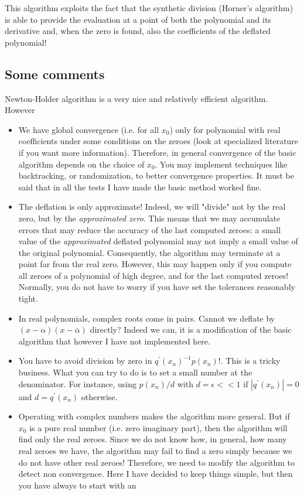 \documentclass[10pt,a4paper]{article}
\theoremstyle{definition}%
\begin{document}
This algorithm  exploits the fact that the synthetic division (Horner's algorithm) is able to provide the evaluation at a point of both the polynomial and its derivative and, when the zero is found, also the coefficients of the deflated polynomial! 
\subsection{Some comments}
Newton-Holder algorithm is a very nice and relatively efficient algorithm. However
\begin{itemize}
    \item We have global convergence (i.e. for all $x_0$) only for polynomial with real coefficients under some conditions on the zeroes (look at specialized literature if you want more information). Therefore, in general convergence of the basic algorithm depends on the choice of $x_0$. You may implement techniques like backtracking, or randomization, to better convergence properties. It must be said that in all the tests I have made the basic method worked fine.
    \item The deflation is only approximate! Indeed, we will "divide" not by the real zero, but by the \emph{approximated zero}. This means that we may accumulate errors that may reduce the accuracy of the last computed zeroes: a small value of the \emph{approximated} deflated polynomial may not imply a small value of the original polynomial. Consequently, the algorithm may terminate at a point far from the real zero. 
    However, this may happen only if you compute all zeroes of a polynomial of high degree, and for the last computed zeroes! Normally, you do not have to worry if you have set the tolerances reasonably tight. 
    \item In real polynomials, complex roots come in pairs. Cannot we deflate by $(x-\alpha)(x-\overline{\alpha})$ directly?
    Indeed we can, it is a modification of the basic algorithm that however I have not implemented here.
    \item You have to avoid division by zero in   $q^\prime(x_n)^{-1}p(x_n)$!.
    This is a tricky business. What you can try to do is
    to set a small number at the denominator. For instance, using $p(x_n)/d$ with $d=\epsilon<<1$ if $|q^\prime(x_n)|=0$ and $d=q^\prime(x_n)$ otherwise. 
    \item Operating with complex numbers makes the algorithm more general. But if $x_0$ is a pure real number (i.e. zero imaginary part), then the algorithm will find only the real zeroes. Since we do not know how, in general, how many real zeroes we have, the algorithm may fail to find a zero simply because we do not have other real zeroes! Therefore, we need to modify the algorithm to detect non convergence. Here I have decided to keep things simple, but then you have always to start with an 

\end{itemize}
\end{document}

